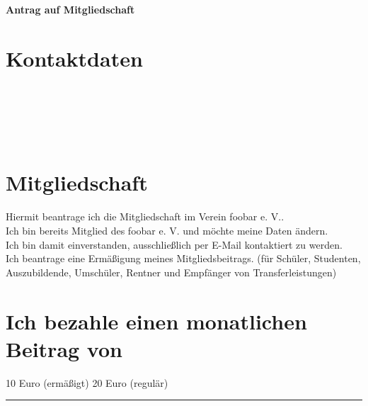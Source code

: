 

\pagestyle{empty}


\begin{Form}
	\begin{flushright}
		\\[3mm]
		\\[3mm]
	\end{flushright}
	\vspace{0.7cm}

\noindent\textbf{\Huge Antrag auf Mitgliedschaft}
\section*{Kontaktdaten}
\\[3mm]
\\[3mm]
\\[3mm]
\\[3mm]

\section*{Mitgliedschaft}
\CheckBox[name=1,bordercolor=black]{} Hiermit beantrage ich die Mitgliedschaft im Verein foobar e. V..\\[1mm]
\CheckBox[name=2,bordercolor=black]{} Ich bin bereits Mitglied des foobar e. V. und möchte meine Daten ändern.\\[1mm]
\CheckBox[name=3,bordercolor=black]{} Ich bin damit einverstanden, ausschließlich per E-Mail kontaktiert zu werden.\\[1mm]
\CheckBox[name=4,bordercolor=black]{} Ich beantrage eine Ermäßigung meines Mitgliedsbeitrags. (für Schüler, Studenten, Auszubildende, Umschüler, Rentner und Empfänger von Transferleistungen)

\section*{Ich bezahle einen monatlichen Beitrag von}
\CheckBox[name=5,bordercolor=black]{} 10 Euro (ermäßigt)\qquad
\CheckBox[name=7,bordercolor=black]{} 20 Euro (regulär)\qquad
\CheckBox[name=6,bordercolor=black]{} \noindent\rule{30mm}{0.4pt}


\end{Form}
